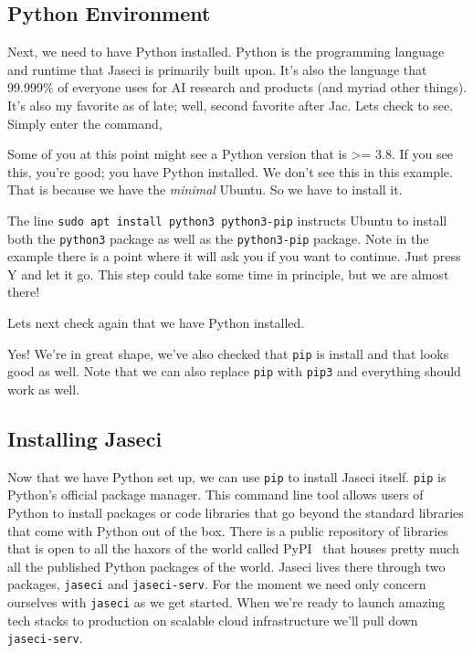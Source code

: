 \subsection{Python Environment}
\par
Next, we need to have Python installed. Python is the programming language and runtime that Jaseci is primarily built upon. It's also the language that 99.999\% of everyone uses for AI research and products (and myriad other things). It's also my favorite as of late; well, second favorite after Jac. Lets check to see. Simply enter the command,
\par
{}
Some of you at this point might see a Python version that is >= 3.8. If you see this, you're good; you have Python installed. We don't see this in this example. That is because we have the \emph{minimal} Ubuntu. So we have to install it.
\par
{}
\par
The line \texttt{sudo apt install python3 python3-pip} instructs Ubuntu to install both the \texttt{python3} package as well as the \texttt{python3-pip} package. Note in the example there is a point where it will ask you if you want to continue. Just press Y and let it go. This step could take some time in principle, but we are almost there!

\par
Lets next check again that we have Python installed.
\par
{}

Yes! We're in great shape, we've also checked that \texttt{pip} is install and that looks good as well. Note that we can also replace \texttt{pip} with \texttt{pip3} and everything should work as well.

\subsection{Installing Jaseci}

Now that we have Python set up, we can use \texttt{pip} to install Jaseci itself. \texttt{pip} is Python's official package manager. This command line tool allows users of Python to install packages or code libraries that go beyond the standard libraries that come with Python out of the box. There is a public repository of libraries that is open to all the haxors of the world called PyPI~\cite{PyPI} that houses pretty much all the published Python packages of the world. Jaseci lives there through two packages, \texttt{jaseci} and \texttt{jaseci-serv}. For the moment we need only concern ourselves with \texttt{jaseci} as we get started. When we're ready to launch amazing tech stacks to production on scalable cloud infrastructure we'll pull down \texttt{jaseci-serv}.

